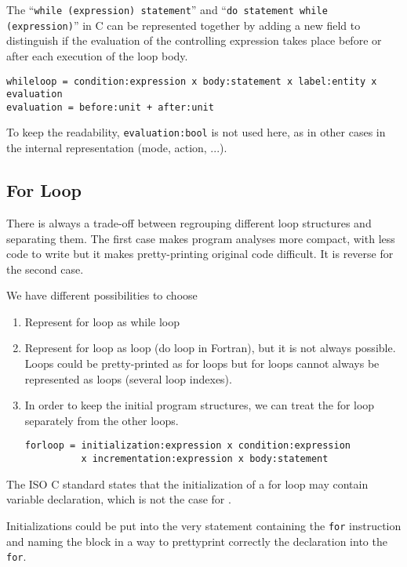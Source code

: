 \documentclass[a4paper]{report}
\begin{document}
The ``\lstinline/while (expression) statement/'' and 
``\lstinline/do statement while (expression)/'' in C can be represented together
 by adding a new field to distinguish
if the evaluation of the
controlling expression takes place before or after each execution of the
loop body.   

\begin{verbatim}
whileloop = condition:expression x body:statement x label:entity x evaluation
evaluation = before:unit + after:unit
\end{verbatim}
To keep the readability, \verb|evaluation:bool| is not used here, as in other
cases in the internal representation (mode, action, ...).

\subsection{For Loop}

There is always a trade-off between regrouping different loop structures
and separating them. The first case makes program analyses more compact,
with less code to write but it makes pretty-printing original code
difficult. It is reverse for the second case. 

We have different possibilities to choose
\begin{enumerate}
\item Represent for loop as while loop
\item Represent for loop as loop (do loop in Fortran), but it is not always
  possible. Loops could be pretty-printed as for loops but for loops cannot
  always be represented as loops (several loop indexes).
\item In order to keep the initial program structures, we can treat the for loop
separately from the other loops. 

\begin{verbatim}
forloop = initialization:expression x condition:expression
          x incrementation:expression x body:statement
\end{verbatim}
\end{enumerate}

The ISO C standard \cite{ISOC} states that
the initialization of a for loop may contain variable declaration, which
is not the case for \cite{Kern78}.

Initializations could be put into the very statement containing the
\texttt{for} instruction and naming the block in a way to prettyprint
correctly the declaration into the \texttt{for}.
\end{document}
